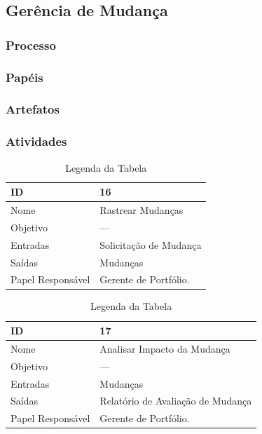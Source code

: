 \subsection{Gerência de Mudança}\label{sec:gerencia}
\subsubsection{Processo}
\subsubsection{Papéis}
\subsubsection{Artefatos}
\subsubsection{Atividades}

\begin{table}[H]
  \centering
    \begin{tabular}{| m{5em} | m{10cm} |}
      \hline
      ID       & 16   \\ \hline
      Nome     & Rastrear Mudanças  \\ \hline
      Objetivo & ---  \\ \hline
      Entradas & Solicitação de Mudança\\ \hline
      Saídas   & Mudanças \\ \hline
      Papel Responsável   & Gerente de Portfólio. \\ \hline
    \end{tabular}
    \caption{Legenda da Tabela}
    \label{tabela:atividade16}
\end{table}

\begin{table}[H]
  \centering
    \begin{tabular}{| m{5em} | m{10cm} |}
      \hline
      ID       & 17   \\ \hline
      Nome     & Analisar Impacto da Mudança \\ \hline
      Objetivo & ---  \\ \hline
      Entradas & Mudanças \\ \hline
      Saídas   & Relatório de Avaliação de Mudança \\ \hline
      Papel Responsável   & Gerente de Portfólio. \\ \hline
    \end{tabular}
    \caption{Legenda da Tabela}
    \label{tabela:atividade17}
\end{table}

